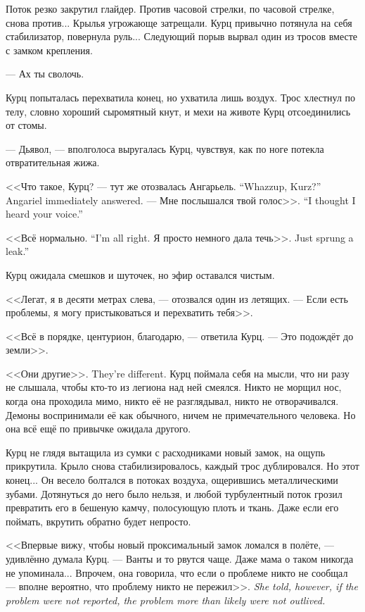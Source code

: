 Поток резко закрутил глайдер.
Против часовой стрелки, по часовой стрелке, снова против...
Крылья угрожающе затрещали.
Курц привычно потянула на себя стабилизатор, повернула руль...
Следующий порыв вырвал один из тросов вместе с замком крепления.

--- Ах ты сволочь.

Курц попыталась перехватила конец, но ухватила лишь воздух.
Трос хлестнул по телу, словно хороший сыромятный кнут, и мехи на животе Курц отсоединились от стомы.

--- Дьявол, --- вполголоса выругалась Курц, чувствуя, как по ноге потекла отвратительная жижа.

{<<Что такое, Курц? --- тут же отозвалась Ангарьель.}
{``Whazzup, Kurz?'' Angariel immediately answered.}
{--- Мне послышался твой голос>>.}
{``I thought I heard your voice.''}

{<<Всё нормально.}
{``I'm all right.}
{Я просто немного дала течь>>.}
{Just sprung a leak.''}

Курц ожидала смешков и шуточек, но эфир оставался чистым.

<<Легат, я в десяти метрах слева, --- отозвался один из летящих.
--- Если есть проблемы, я могу пристыковаться и перехватить тебя>>.

<<Всё в порядке, центурион, благодарю, --- ответила Курц.
--- Это подождёт до земли>>.

{<<Они другие>>.}
{They're different.}
Курц поймала себя на мысли, что ни разу не слышала, чтобы кто-то из легиона над ней смеялся.
Никто не морщил нос, когда она проходила мимо, никто её не разглядывал, никто не отворачивался.
Демоны воспринимали её как обычного, ничем не примечательного человека.
Но она всё ещё по привычке ожидала другого.

Курц не глядя вытащила из сумки с расходниками новый замок, на ощупь прикрутила.
Крыло снова стабилизировалось, каждый трос дублировался.
Но этот конец...
Он весело болтался в потоках воздуха, ощерившись металлическими зубами.
Дотянуться до него было нельзя, и любой турбулентный поток грозил превратить его в бешеную камчу, полосующую плоть и ткань.
Даже если его поймать, вкрутить обратно будет непросто.

<<Впервые вижу, чтобы новый проксимальный замок ломался в полёте, --- удивлённо думала Курц.
--- Ванты и то рвутся чаще.
Даже мама о таком никогда не упоминала...
{Впрочем, она говорила, что если о проблеме никто не сообщал --- вполне вероятно, что проблему никто не пережил>>.}
{\textit{She told, however, if the problem were not reported, the problem more than likely were not outlived.}}

